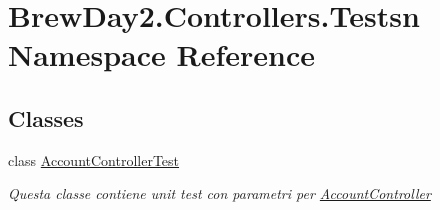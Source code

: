 \hypertarget{namespace_brew_day2_1_1_controllers_1_1_testsn}{}\section{Brew\+Day2.\+Controllers.\+Testsn Namespace Reference}
\label{namespace_brew_day2_1_1_controllers_1_1_testsn}
\subsection*{Classes}
\begin{DoxyCompactItemize}
\item 
class \mbox{\hyperlink{class_brew_day2_1_1_controllers_1_1_testsn_1_1_account_controller_test}{Account\+Controller\+Test}}
\begin{DoxyCompactList}\small\item\em Questa classe contiene unit test con parametri per \mbox{\hyperlink{class_brew_day2_1_1_controllers_1_1_account_controller}{Account\+Controller}}\end{DoxyCompactList}\end{DoxyCompactItemize}
